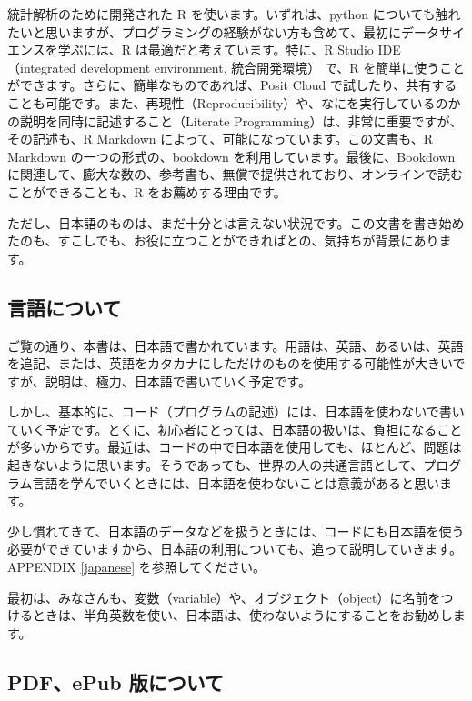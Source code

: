 \documentclass[
]{bxjsbook}
\theoremstyle{definition}
\theoremstyle{definition}
\theoremstyle{definition}
\theoremstyle{definition}
\theoremstyle{remark}
\begin{document}
統計解析のために開発された R を使います。いずれは、python についても触れたいと思いますが、プログラミングの経験がない方も含めて、最初にデータサイエンスを学ぶには、R は最適だと考えています。特に、R Studio IDE（integrated development environment, 統合開発環境） で、R を簡単に使うことができます。さらに、簡単なものであれば、Posit Cloud で試したり、共有することも可能です。また、再現性（Reproducibility）や、なにを実行しているのかの説明を同時に記述すること（Literate Programming）は、非常に重要ですが、その記述も、R Markdown によって、可能になっています。この文書も、R Markdown の一つの形式の、bookdown を利用しています。最後に、Bookdown に関連して、膨大な数の、参考書も、無償で提供されており、オンラインで読むことができることも、R をお薦めする理由です。

ただし、日本語のものは、まだ十分とは言えない状況です。この文書を書き始めたのも、すこしでも、お役に立つことができればとの、気持ちが背景にあります。

\hypertarget{ux8a00ux8a9eux306bux3064ux3044ux3066}{%
\subsection*{言語について}\label{ux8a00ux8a9eux306bux3064ux3044ux3066}}

ご覧の通り、本書は、日本語で書かれています。用語は、英語、あるいは、英語を追記、または、英語をカタカナにしただけのものを使用する可能性が大きいですが、説明は、極力、日本語で書いていく予定です。

しかし、基本的に、コード（プログラムの記述）には、日本語を使わないで書いていく予定です。とくに、初心者にとっては、日本語の扱いは、負担になることが多いからです。最近は、コードの中で日本語を使用しても、ほとんど、問題は起きないように思います。そうであっても、世界の人の共通言語として、プログラム言語を学んでいくときには、日本語を使わないことは意義があると思います。

少し慣れてきて、日本語のデータなどを扱うときには、コードにも日本語を使う必要ができていますから、日本語の利用についても、追って説明していきます。APPENDIX \ref{japanese} を参照してください。

最初は、みなさんも、変数（variable）や、オブジェクト（object）に名前をつけるときは、半角英数を使い、日本語は、使わないようにすることをお勧めします。

\hypertarget{pdfepub-ux7248ux306bux3064ux3044ux3066}{%
\subsection*{PDF、ePub 版について}\label{pdfepub-ux7248ux306bux3064ux3044ux3066}}
\end{document}
